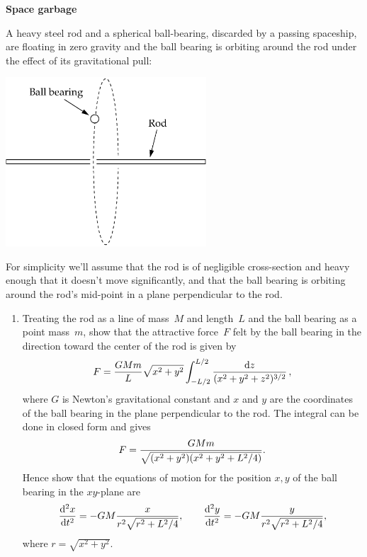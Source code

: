 \documentclass[12pt]{article}
\begin{document}
\begin{exercises}

\exercise \textbf{Space garbage}

\exskip A heavy steel rod and a spherical
ball-bearing, discarded by a passing spaceship, are floating in zero
gravity and the ball bearing is orbiting around the rod under the effect of
its gravitational pull:
\begin{center}
\includegraphics[width=7.5cm]{rod.eps}
\end{center}
For simplicity we'll assume that the rod is of negligible cross-section and
heavy enough that it doesn't move significantly, and that the ball bearing
is orbiting around the rod's mid-point in a plane perpendicular to the rod.
\begin{enumerate}\setlength{\itemsep}{0pt}
\item Treating the rod as a line of mass~$M$ and length~$L$ and the ball
  bearing as a point mass~$m$, show that the attractive force~$F$ felt by
  the ball bearing in the direction toward the center of the rod is given
  by
\begin{displaymath}
F = {GMm\over L} \sqrt{x^2+y^2}
    \int_{-L/2}^{L/2} {\mathrm{d} z\over(x^2+y^2+z^2)^{3/2}}\,,
\end{displaymath}
where $G$ is Newton's gravitational constant and $x$ and $y$ are the
coordinates of the ball bearing in the plane perpendicular to the rod.  The
integral can be done in closed form and gives
\begin{displaymath}
F = {GMm\over\sqrt{(x^2+y^2)(x^2+y^2+L^2/4)}}.
\end{displaymath}
Hence show that the equations of motion for the position $x,y$ of the ball
bearing in the $xy$-plane are
\begin{displaymath}
{\mathrm{d}^2 x\over\mathrm{d}t^2} = - GM {x\over r^2\sqrt{r^2+L^2/4}},\qquad
{\mathrm{d}^2 y\over\mathrm{d}t^2} = - GM {y\over r^2\sqrt{r^2+L^2/4}},
\end{displaymath}
where $r=\sqrt{x^2+y^2}$.

\end{enumerate}
\end{exercises}
\end{document}

